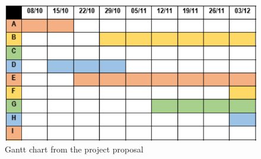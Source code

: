 \documentclass{sig-alternate-05-2015}
\begin{document}
\begin{figure}[t]
\centering
\includegraphics[scale=0.33]{Images/gantt.png}
\caption{Gantt chart from the project proposal}
\label{fig:Gantt}
\end{figure}
\end{document}

